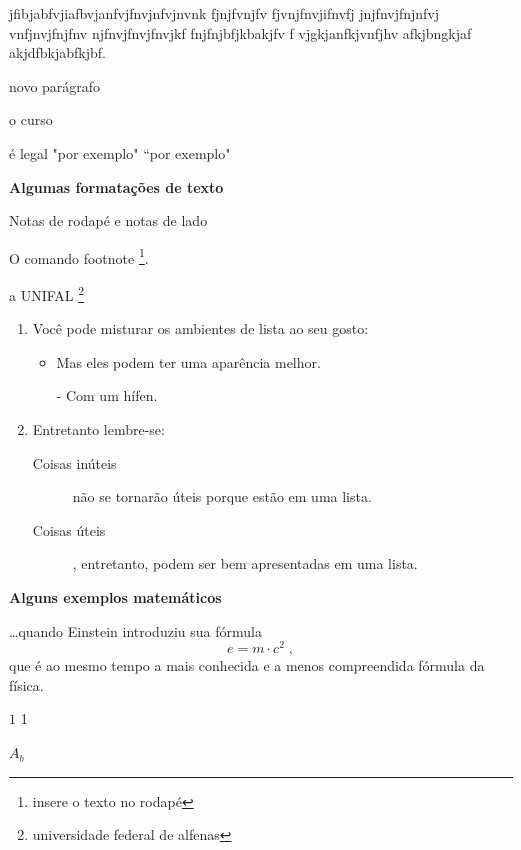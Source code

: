 \documentclass[12pt,openright]{report}
\begin{document}
jfibjabfvjiafbvjanfvjfnvjnfvjnvnk fjnjfvnjfv fjvnjfnvjifnvfj jnjfnvjfnjnfvj vnfjnvjfnjfnv njfnvjfnvjfnvjkf fnjfnjbfjkbakjfv f vjgkjanfkjvnfjhv afkjbngkjaf akjdfbkjabfkjbf. 

novo parágrafo 

o curso %

 é legal "por exemplo" ``por exemplo"




\newpage

\begin{center}
	{\LARGE 	\textbf{Algumas formatações de texto}}
\end{center}

Notas de rodapé e notas de lado

O comando footnote \footnote{insere o texto no rodapé}.

a UNIFAL \footnote{universidade federal de alfenas}

\begin{enumerate}
	\item Você pode misturar os
	ambientes de lista ao seu gosto:
	\begin{itemize}
		\item Mas eles podem ter uma
		aparência melhor.
		\item[-] Com um hífen.
	\end{itemize}
	\item Entretanto lembre-se:
	\begin{description}
		\item[Coisas inúteis] não se tornarão
		úteis porque estão em uma lista.
		\item[Coisas úteis], entretanto, podem
		ser bem apresentadas em uma lista.
	\end{description}
\end{enumerate}
\newpage
\begin{center}
	{\LARGE \textbf{Alguns exemplos matemáticos}}
\end{center}

\ldots quando Einstein introduziu sua fórmula
\begin{equation}
e = m \cdot c^2 \; ,
\end{equation}
que é ao mesmo tempo a mais conhecida
e a menos compreendida fórmula da física.








$ 1 $ 1

$ A_b $
\end{document}
